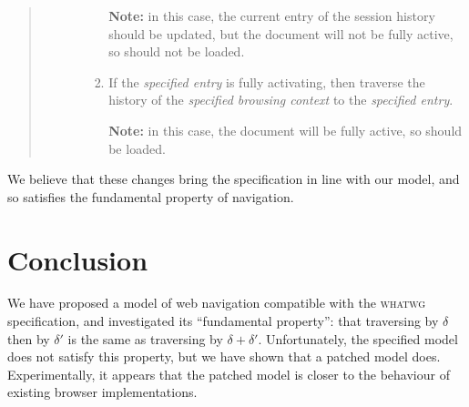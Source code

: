 \documentclass{notes}
\begin{document}
\begin{quote}
\begin{enumerate}
\begin{enumerate}
\begin{enumerate}
        \textbf{Note:} in this case, the current entry of the session history should
        be updated, but the document will not be fully active, so should not be loaded.
    
      \item If the \emph{specified entry} is fully activating, then
        traverse the history of the \emph{specified browsing context}
        to the \emph{specified entry}.
        
        \textbf{Note:} in this case, the document will be fully active, so should be loaded.
    
      \end{enumerate}
      
    \end{enumerate}

  \end{enumerate}
\end{quote}
We believe that these changes bring the specification in line with our model, and
so satisfies the fundamental property of navigation.

\section{Conclusion}

We have proposed a model of web navigation compatible with the
\textsc{whatwg} specification, and investigated its ``fundamental
property'': that traversing by $\delta$ then by $\delta'$ is the same
as traversing by $\delta+\delta'$.  Unfortunately, the specified model
does not satisfy this property, but we have shown that a patched model
does. Experimentally, it appears that the patched model is closer to
the behaviour of existing browser implementations. 




\appendix

\end{document}
